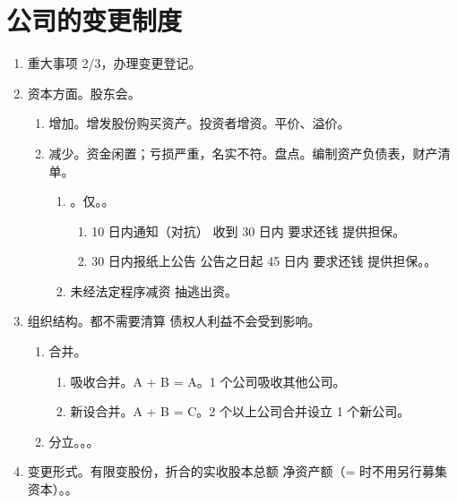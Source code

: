 \section{公司的变更制度}
\begin{enumerate}
  \item 重大事项 2/3，办理变更登记。
  \item 资本方面。股东会。
        \begin{enumerate}
          \item 增加。\yi 增发股份购买资产。\er 投资者增资。平价、溢价。
          \item 减少。资金闲置；亏损严重，名实不符。盘点。编制资产负债表，财产清单。
                \begin{enumerate}
                  \item {}。仅。。
                        \begin{enumerate}
                          \item 10 日内通知（对抗） \yjt 收到 30 日内 \yjt 要求还钱 \hz 提供担保。
                          \item 30 日内报纸上公告 \yjt 公告之日起 45 日内 \yjt 要求还钱 \hz 提供担保。。
                        \end{enumerate}
                  \item 未经法定程序减资 \ydy 抽逃出资。
                \end{enumerate}
        \end{enumerate}
  \item 组织结构。都不需要清算 \yjt 债权人利益不会受到影响。
        \begin{enumerate}
          \item 合并。
                \begin{enumerate}
                  \item 吸收合并。A + B = A。1 个公司吸收其他公司。
                  \item 新设合并。A + B = C。2 个以上公司合并设立 1 个新公司。
                \end{enumerate}
          \item 分立。。。
        \end{enumerate}
  \item 变更形式。有限变股份，折合的实收股本总额 \xydy 净资产额（= 时不用另行募集资本）。。
\end{enumerate}
